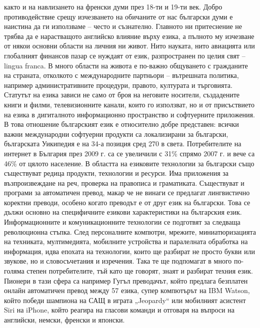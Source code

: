 \begin{multicols}{2}
както и на навлизането на френски думи през 18-ти и 19-ти век. Добро противодействие срещу изчезването на обичаните от нас български думи е наистина да ги използваме – често и съзнателно.  Главното ни притеснение не трябва да е нарастващото английско влияние върху езика, а пълното му изчезване от някои основни области на личния ни живот. Нито науката, нито авиацията или глобалният финансов пазар се нуждаят от език, разпространен по целия свят -- lingua franca. В много области на живота е по-важно общуването с гражданите на страната, отколкото с международните партньори – вътрешната политика, например административните процедури, правото, културата и търговията. Статутът на езика зависи не само от броя на неговите носители, създадените книги и филми, телевизионните канали, които го използват, но и от присъствието на езика в дигиталното информационно пространство и софтуерните приложения.  В това отношение българският език е относително добре представен: всички важни международни софтуерни продукти са локализирани за български, българската Уикипедия е на 34-а позиция сред 270 в света. Потребителите на интернет в България през 2009 г. са се увеличили с 31\% спрямо 2007 г. и вече са 46\% от цялото население.  В областта на езиковите технологии за български също съществуват редица продукти, технологии и ресурси. Има приложения за възпроизвеждане на реч, проверка на правописа и граматиката. Съществуват и програми за автоматичен превод, макар че не винаги се предлагат лингвистично коректни преводи, особено когато преводът е от друг език на български. Това се дължи основно на специфичните езикови характеристики на българския език.  Информационните и комуникационните технологии се подготвят за следваща революционна стъпка. След персоналните компютри, мрежите, миниатюризацията на техниката, мултимедията, мобилните устройства и паралелната обработка на информация, идва епохата на технологии, които ще разбират не просто букви или звукове, но и словосъчетания и изречения. Така те ще подпомагат в много по-голяма степен потребителите, тъй като ще говорят, знаят и разбират техния език. Пионери в тази сфера са например Гугъл преводачът, който предлага безплатен онлайн автоматичен превод между 57 езика, супер компютърът на IBM Watson, който победи шампиона на САЩ в играта „Jeopardy“ или мобилният асистент Siri на iPhone, който реагира на гласови команди и отговаря на въпроси на английски, немски, френски и японски.


\end{multicols}
